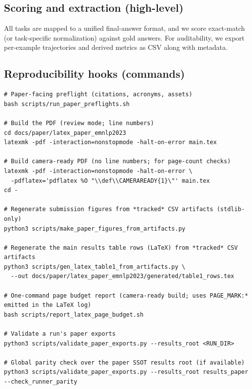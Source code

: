 \documentclass[11pt]{article}
\begin{document}
\subsection{Scoring and extraction (high-level)}
All tasks are mapped to a unified final-answer format, and we score exact-match (or task-specific normalization) against gold answers.
For auditability, we export per-example trajectories and derived metrics as CSV along with metadata.

\subsection{Reproducibility hooks (commands)}
\begin{Verbatim}[breaklines,breakanywhere,fontsize=\small]
# Paper-facing preflight (citations, acronyms, assets)
bash scripts/run_paper_preflights.sh

# Build the PDF (review mode; line numbers)
cd docs/paper/latex_paper_emnlp2023
latexmk -pdf -interaction=nonstopmode -halt-on-error main.tex

# Build camera-ready PDF (no line numbers; for page-count checks)
latexmk -pdf -interaction=nonstopmode -halt-on-error \
  -pdflatex='pdflatex %O "\\def\\CAMERAREADY{1}\"' main.tex
cd -

# Regenerate submission figures from *tracked* CSV artifacts (stdlib-only)
python3 scripts/make_paper_figures_from_artifacts.py

# Regenerate the main results table rows (LaTeX) from *tracked* CSV artifacts
python3 scripts/gen_latex_table1_from_artifacts.py \
  --out docs/paper/latex_paper_emnlp2023/generated/table1_rows.tex

# One-command page budget report (camera-ready build; uses PAGE_MARK:* emitted in the LaTeX log)
bash scripts/report_latex_page_budget.sh

# Validate a run's paper exports
python3 scripts/validate_paper_exports.py --results_root <RUN_DIR>

# Global parity check over the paper SSOT results root (if available)
python3 scripts/validate_paper_exports.py --results_root results_paper --check_runner_parity
\end{Verbatim}
\end{document}
